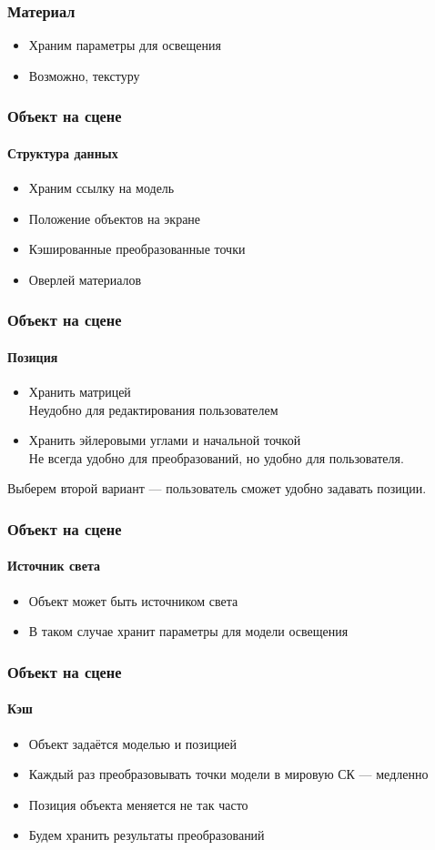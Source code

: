 \documentclass{beamer}
\begin{document}
\begin{frame}
\begin{frame}
\frametitle{Материал}

\begin{itemize}
\item Храним параметры для освещения
\item Возможно, текстуру
\end{itemize}
\end{frame}

\begin{frame}
\frametitle{Объект на сцене}
\framesubtitle{Структура данных}

\begin{itemize}
\item Храним ссылку на модель
\item Положение объектов на экране
\item Кэшированные преобразованные точки
\item Оверлей материалов
\end{itemize}
\end{frame}

\begin{frame}
\frametitle{Объект на сцене}
\framesubtitle{Позиция}

\begin{itemize}
\item Хранить матрицей \\
Неудобно для редактирования пользователем
\item Хранить эйлеровыми углами и начальной точкой \\
Не всегда удобно для преобразований, но удобно для пользователя.
\end{itemize}
Выберем второй вариант --- пользователь сможет удобно задавать позиции.
\end{frame}

\begin{frame}
\frametitle{Объект на сцене}
\framesubtitle{Источник света}

\begin{itemize}
\item Объект может быть источником света
\item В таком случае хранит параметры для модели освещения
\end{itemize}
\end{frame}

\begin{frame}
\frametitle{Объект на сцене}
\framesubtitle{Кэш}

\begin{itemize}
\item Объект задаётся моделью и позицией
\item Каждый раз преобразовывать точки модели в мировую СК --- медленно
\item Позиция объекта меняется не так часто
\item Будем хранить результаты преобразований
\end{itemize}
\end{frame}


\end{frame}
\end{document}
